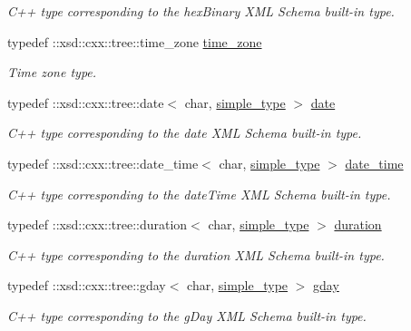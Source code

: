 \begin{DoxyCompactItemize}
\begin{DoxyCompactList}\small\item\em C++ type corresponding to the hex\+Binary X\+M\+L Schema built-\/in type. \end{DoxyCompactList}\item 
typedef \+::xsd\+::cxx\+::tree\+::time\+\_\+zone \hyperlink{namespacexml__schema_a8e57a44a0fd5762cb4132689a635d6c3}{time\+\_\+zone}
\begin{DoxyCompactList}\small\item\em Time zone type. \end{DoxyCompactList}\item 
typedef \+::xsd\+::cxx\+::tree\+::date$<$ char, \hyperlink{namespacexml__schema_a44789bb4367951bcf8ae867cb983324d}{simple\+\_\+type} $>$ \hyperlink{namespacexml__schema_ad715e8c0fbf8ec80f67de561627f11bf}{date}
\begin{DoxyCompactList}\small\item\em C++ type corresponding to the date X\+M\+L Schema built-\/in type. \end{DoxyCompactList}\item 
typedef \+::xsd\+::cxx\+::tree\+::date\+\_\+time$<$ char, \hyperlink{namespacexml__schema_a44789bb4367951bcf8ae867cb983324d}{simple\+\_\+type} $>$ \hyperlink{namespacexml__schema_a4e3e937826b835b568d6a97bdaaf0804}{date\+\_\+time}
\begin{DoxyCompactList}\small\item\em C++ type corresponding to the date\+Time X\+M\+L Schema built-\/in type. \end{DoxyCompactList}\item 
typedef \+::xsd\+::cxx\+::tree\+::duration$<$ char, \hyperlink{namespacexml__schema_a44789bb4367951bcf8ae867cb983324d}{simple\+\_\+type} $>$ \hyperlink{namespacexml__schema_acd79b4620c053b211a2e739daed3b2bf}{duration}
\begin{DoxyCompactList}\small\item\em C++ type corresponding to the duration X\+M\+L Schema built-\/in type. \end{DoxyCompactList}\item 
typedef \+::xsd\+::cxx\+::tree\+::gday$<$ char, \hyperlink{namespacexml__schema_a44789bb4367951bcf8ae867cb983324d}{simple\+\_\+type} $>$ \hyperlink{namespacexml__schema_a4beba84e7d1a15ea569cad2c7cc2247a}{gday}
\begin{DoxyCompactList}\small\item\em C++ type corresponding to the g\+Day X\+M\+L Schema built-\/in type. \end{DoxyCompactList}\item 

\end{DoxyCompactItemize}
